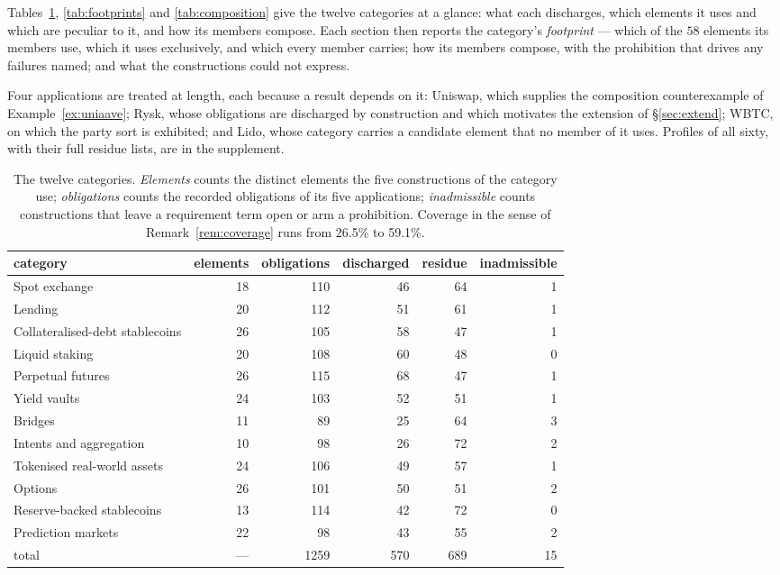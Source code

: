 \documentclass[11pt,reqno]{amsart}
\theoremstyle{plain}
\theoremstyle{definition}
\theoremstyle{remark}
\begin{document}
Tables~\ref{tab:categories}, \ref{tab:footprints} and \ref{tab:composition}
give the twelve categories at a glance: what each discharges, which elements
it uses and which are peculiar to it, and how its members compose. Each
section then reports the category's \emph{footprint} --- which of the $58$
elements its members use, which it uses exclusively, and which every member
carries; how its members compose, with the prohibition that drives any failures
named; and what the constructions could not express.

Four applications are treated at length, each because a result depends on it:
Uniswap, which supplies the composition counterexample of
Example~\ref{ex:uniaave}; Rysk, whose obligations are discharged by construction
and which motivates the extension of \S\ref{sec:extend}; WBTC, on which the
party sort is exhibited; and Lido, whose category carries a candidate element
that no member of it uses. Profiles of all sixty, with their full residue
lists, are in the supplement.

\begin{table}[t]
\centering\small
\begin{tabular}{lrrrrr}
\toprule
category & elements & obligations & discharged & residue & inadmissible \\
\midrule
Spot exchange & 18 & 110 & 46 & 64 & 1 \\
Lending & 20 & 112 & 51 & 61 & 1 \\
Collateralised-debt stablecoins & 26 & 105 & 58 & 47 & 1 \\
Liquid staking & 20 & 108 & 60 & 48 & 0 \\
Perpetual futures & 26 & 115 & 68 & 47 & 1 \\
Yield vaults & 24 & 103 & 52 & 51 & 1 \\
Bridges & 11 & 89 & 25 & 64 & 3 \\
Intents and aggregation & 10 & 98 & 26 & 72 & 2 \\
Tokenised real-world assets & 24 & 106 & 49 & 57 & 1 \\
Options & 26 & 101 & 50 & 51 & 2 \\
Reserve-backed stablecoins & 13 & 114 & 42 & 72 & 0 \\
Prediction markets & 22 & 98 & 43 & 55 & 2 \\
\midrule
total & --- & 1259 & 570 & 689 & 15 \\
\bottomrule
\end{tabular}
\caption{The twelve categories. \emph{Elements} counts the distinct
elements the five constructions of the category use; \emph{obligations}
counts the recorded obligations of its five applications;
\emph{inadmissible} counts constructions that leave a requirement term
open or arm a prohibition. Coverage in the sense of
Remark~\ref{rem:coverage} runs from 26.5\% to 59.1\%.}
\label{tab:categories}
\end{table}
\end{document}
